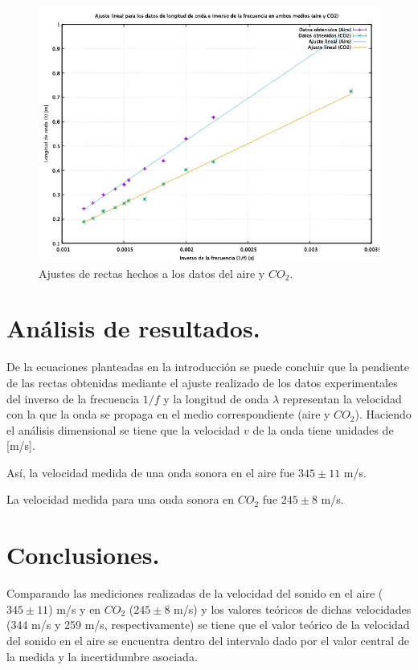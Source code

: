 \documentclass[10pt,a4paper]{article}
\begin{document}
\begin{figure}[H]
\includegraphics[scale=0.5]{AireyCO2.png}
\centering
\caption{Ajustes de rectas hechos a los datos del aire y $CO_2$.}
\end{figure}


\section{Análisis de resultados.}

De la ecuaciones planteadas en la introducción se puede concluir que la pendiente de las rectas obtenidas mediante el ajuste realizado de los datos experimentales del inverso de la frecuencia $1/f$ y la longitud de onda $\lambda$ representan la velocidad con la que la onda se propaga en el medio correspondiente (aire y $CO_2$). Haciendo el análisis dimensional se tiene que la velocidad $v$ de la onda tiene unidades de [m/s].

Así, la velocidad medida de una onda sonora en el aire fue $345 \pm 11$ m/s.

La velocidad medida para una onda sonora en $CO_2$ fue $245 \pm 8$ m/s.


\section{Conclusiones.}

Comparando las mediciones realizadas de la velocidad del sonido en el aire ($345 \pm 11$) m/s y en $CO_2$ ($245 \pm 8$ m/s) y los valores teóricos de dichas velocidades (344 m/s y 259 m/s, respectivamente) se tiene que el valor teórico de la velocidad del sonido en el aire se encuentra dentro del intervalo dado por el valor central de la medida y la incertidumbre asociada.
\end{document}
